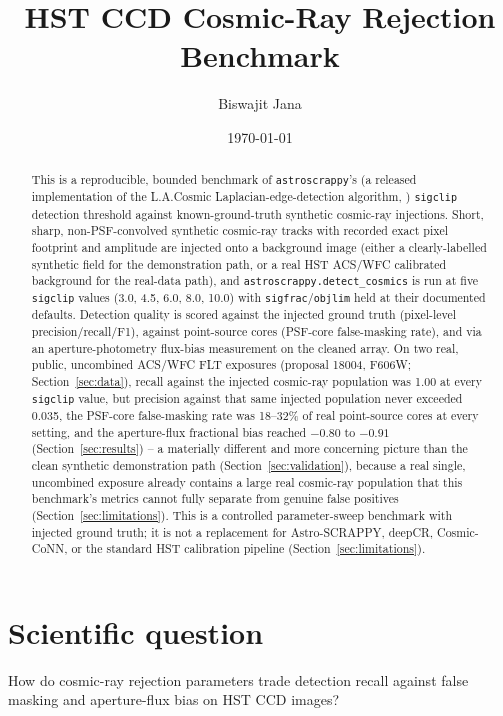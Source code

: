 \documentclass[11pt]{article}
\title{HST CCD Cosmic-Ray Rejection Benchmark}
\author{Biswajit Jana}
\date{\today}
\begin{document}
\maketitle

\begin{abstract}
This is a reproducible, bounded benchmark of \texttt{astroscrappy}'s
(a released implementation of the L.A.Cosmic Laplacian-edge-detection
algorithm, \citealp{vanDokkum2001,Astroscrappy}) \texttt{sigclip} detection
threshold against known-ground-truth synthetic cosmic-ray injections. Short,
sharp, non-PSF-convolved synthetic cosmic-ray tracks with recorded exact
pixel footprint and amplitude are injected onto a background image (either a
clearly-labelled synthetic field for the demonstration path, or a real HST
ACS/WFC calibrated background for the real-data path), and
\texttt{astroscrappy.detect\_cosmics} is run at five \texttt{sigclip} values
(3.0, 4.5, 6.0, 8.0, 10.0) with \texttt{sigfrac}/\texttt{objlim} held at their
documented defaults. Detection quality is scored against the injected
ground truth (pixel-level precision/recall/F1), against point-source cores
(PSF-core false-masking rate), and via an aperture-photometry flux-bias
measurement on the cleaned array. On two real, public, uncombined ACS/WFC
FLT exposures (proposal 18004, F606W; Section~\ref{sec:data}), recall
against the injected cosmic-ray population was 1.00 at every
\texttt{sigclip} value, but precision against that same injected population
never exceeded 0.035, the PSF-core false-masking rate was 18--32\% of real
point-source cores at every setting, and the aperture-flux fractional bias
reached $-0.80$ to $-0.91$ (Section~\ref{sec:results}) -- a materially
different and more concerning picture than the clean synthetic
demonstration path (Section~\ref{sec:validation}), because a real single,
uncombined exposure already contains a large real cosmic-ray population that
this benchmark's metrics cannot fully separate from genuine false positives
(Section~\ref{sec:limitations}). This is a controlled parameter-sweep
benchmark with injected ground truth; it is not a replacement for
Astro-SCRAPPY, deepCR, Cosmic-CoNN, or the standard HST calibration pipeline
(Section~\ref{sec:limitations}).
\end{abstract}

\section{Scientific question}
How do cosmic-ray rejection parameters trade detection recall against false
masking and aperture-flux bias on HST CCD images?
\end{document}
